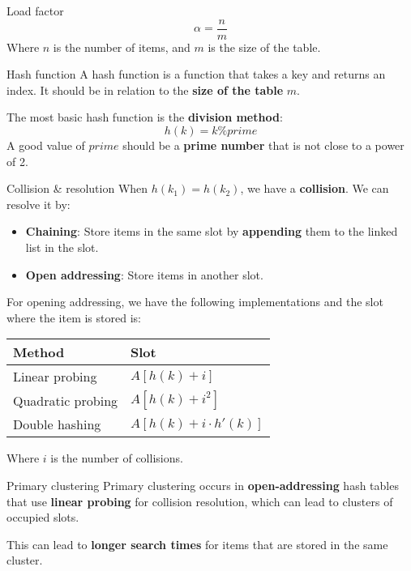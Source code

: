 \begin{knBox}
    {Load factor}
    \[
        \alpha = \frac{n}{m}
    \]
    Where $n$ is the number of items, and $m$ is the size of the table.
\end{knBox}

\begin{theorem}
    {Hash function}
    A hash function is a function that takes a key and returns an index. It should be in relation to the \textbf{size of the table} $m$.

    The most basic hash function is the \textbf{division method}:
    \[
        h(k) = k \% prime
    \]
    A good value of $prime$ should be a \textbf{prime number} that is not close to a power of 2.
\end{theorem}
\label{thm:hash-function}

\begin{theorem}
    {Collision \& resolution}
    When $h(k_1) = h(k_2)$, we have a \textbf{collision}. We can resolve it by:
    \begin{itemize}
        \item \textbf{Chaining}: Store items in the same slot by \textbf{appending} them to the linked list in the slot.
        \item \textbf{Open addressing}: Store items in another slot.
    \end{itemize}
    For opening addressing, we have the following implementations and the slot where the item is stored is:

    \begin{tabular}{|l|l|}
        \hline
        \textbf{Method}   & \textbf{Slot}             \\
        \hline
        Linear probing    & $A[h(k) + i]$             \\
        Quadratic probing & $A[h(k) + i^2]$           \\
        Double hashing    & $A[h(k) + i \cdot h'(k)]$ \\
        \hline
    \end{tabular}

    Where $i$ is the number of collisions.
\end{theorem}
\label{thm:collision-resolution}

\begin{knBox}
    {Primary clustering}
    Primary clustering occurs in \textbf{open-addressing} hash tables that use \textbf{linear probing} for collision resolution, which can lead to clusters of occupied slots.

    This can lead to \textbf{longer search times} for items that are stored in the same cluster.
\end{knBox}


